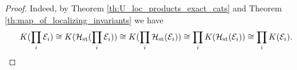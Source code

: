\documentclass[11pt,leqno]{amsart}
\newtheorem{prop}[theo]{Proposition}
\numberwithin{equation}{section}
\def\h{\operatorname{h}}
\def\Hom{\operatorname{Hom}}
\newcommand{\prim}{\operatorname{prim}}
\newcommand{\st}{\operatorname{st}}
\newcommand{\cE}{{\mathcal E}}
\newcommand{\cH}{{\mathcal H}}
\newcommand{\Stab}{\rm Stab}
\newcommand{\acycl}{\operatorname{acycl}}
\begin{document}
\begin{proof}Indeed, by Theorem \ref{th:U_loc_products_exact_cats} and Theorem \ref{th:map_of_localizing_invariants} we have 
\begin{equation*}K(\prod\limits_i\cE_i)\cong K(\cH_{\st}(\prod\limits_i\cE_i))\cong K(\prod\limits_i\cH_{\st}(\cE_i))\cong \prod\limits_i K(\cH_{\st}(\cE_i))\cong \prod\limits_i K(\cE_i).\qedhere\end{equation*}\end{proof}






\end{document}
